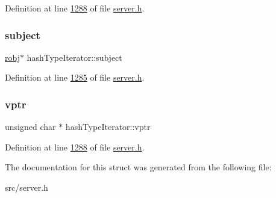 Definition at line \hyperlink{server_8h_source_l01288}{1288} of file \hyperlink{server_8h_source}{server.\+h}.

\mbox{\label{structhashTypeIterator_af6292b220bff1b4e07c3e5e1a81a93eb}} 
\subsubsection{\texorpdfstring{subject}{subject}}
{\footnotesize\ttfamily \hyperlink{structredisObject}{robj}$\ast$ hash\+Type\+Iterator\+::subject}



Definition at line \hyperlink{server_8h_source_l01285}{1285} of file \hyperlink{server_8h_source}{server.\+h}.

\mbox{\label{structhashTypeIterator_ae3bfaea89400c690dc432787e212f6df}} 
\subsubsection{\texorpdfstring{vptr}{vptr}}
{\footnotesize\ttfamily unsigned char $\ast$ hash\+Type\+Iterator\+::vptr}



Definition at line \hyperlink{server_8h_source_l01288}{1288} of file \hyperlink{server_8h_source}{server.\+h}.



The documentation for this struct was generated from the following file\+:\begin{DoxyCompactItemize}
\item 
src/server.\+h\end{DoxyCompactItemize}
